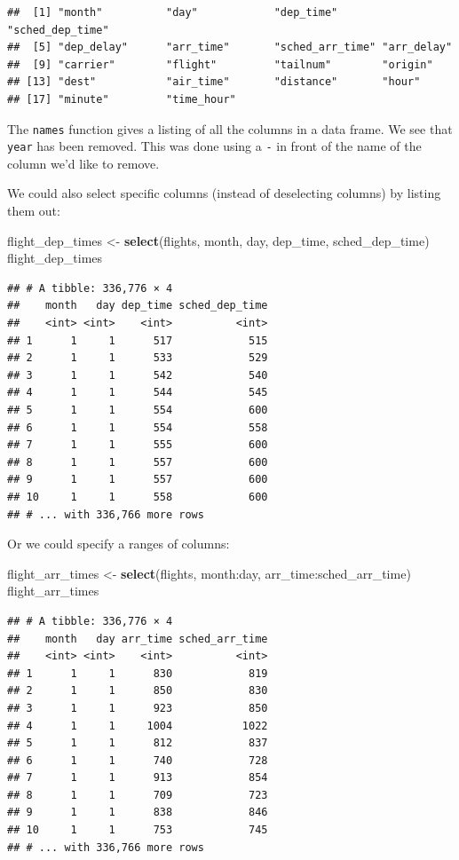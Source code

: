 \documentclass[]{tufte-book}
\newenvironment{Shaded}{\begin{snugshade}}{\end{snugshade}}
\newcommand{\KeywordTok}[1]{\textcolor[rgb]{0.13,0.29,0.53}{\textbf{{#1}}}}
\newcommand{\StringTok}[1]{\textcolor[rgb]{0.31,0.60,0.02}{{#1}}}
\newcommand{\NormalTok}[1]{{#1}}
\begin{document}
\begin{verbatim}
##  [1] "month"          "day"            "dep_time"       "sched_dep_time"
##  [5] "dep_delay"      "arr_time"       "sched_arr_time" "arr_delay"     
##  [9] "carrier"        "flight"         "tailnum"        "origin"        
## [13] "dest"           "air_time"       "distance"       "hour"          
## [17] "minute"         "time_hour"
\end{verbatim}

The \texttt{names} function gives a listing of all the columns in a data
frame. We see that \texttt{year} has been removed. This was done using a
\texttt{-} in front of the name of the column we'd like to remove.

We could also select specific columns (instead of deselecting columns)
by listing them out:

\begin{Shaded}
\begin{Highlighting}[]
\NormalTok{flight_dep_times <-}\StringTok{ }\KeywordTok{select}\NormalTok{(flights, month, day, dep_time, sched_dep_time)}
\NormalTok{flight_dep_times}
\end{Highlighting}
\end{Shaded}

\begin{verbatim}
## # A tibble: 336,776 × 4
##    month   day dep_time sched_dep_time
##    <int> <int>    <int>          <int>
## 1      1     1      517            515
## 2      1     1      533            529
## 3      1     1      542            540
## 4      1     1      544            545
## 5      1     1      554            600
## 6      1     1      554            558
## 7      1     1      555            600
## 8      1     1      557            600
## 9      1     1      557            600
## 10     1     1      558            600
## # ... with 336,766 more rows
\end{verbatim}

Or we could specify a ranges of columns:

\begin{Shaded}
\begin{Highlighting}[]
\NormalTok{flight_arr_times <-}\StringTok{ }\KeywordTok{select}\NormalTok{(flights, month:day, arr_time:sched_arr_time)}
\NormalTok{flight_arr_times}
\end{Highlighting}
\end{Shaded}

\begin{verbatim}
## # A tibble: 336,776 × 4
##    month   day arr_time sched_arr_time
##    <int> <int>    <int>          <int>
## 1      1     1      830            819
## 2      1     1      850            830
## 3      1     1      923            850
## 4      1     1     1004           1022
## 5      1     1      812            837
## 6      1     1      740            728
## 7      1     1      913            854
## 8      1     1      709            723
## 9      1     1      838            846
## 10     1     1      753            745
## # ... with 336,766 more rows
\end{verbatim}
\end{document}
